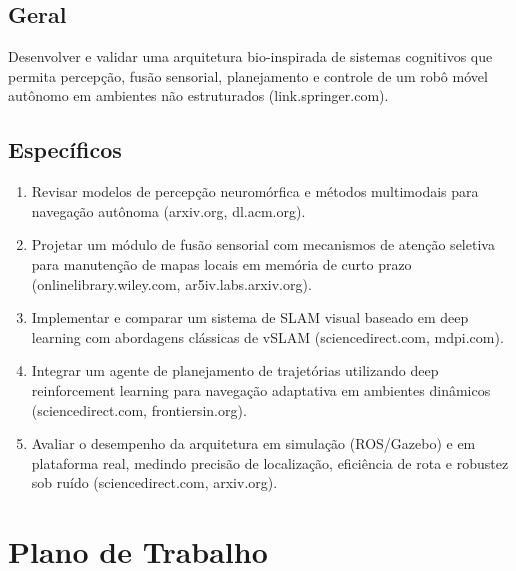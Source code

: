 \documentclass[a4paper,12pt]{article}
\begin{document}
	\subsection{Geral}
	Desenvolver e validar uma arquitetura bio-inspirada de sistemas cognitivos que permita percepção, fusão sensorial, planejamento e controle de um robô móvel autônomo em ambientes não estruturados (link.springer.com).
	
	\subsection{Específicos}
	\begin{enumerate}
		\item Revisar modelos de percepção neuromórfica e métodos multimodais para navegação autônoma (arxiv.org, dl.acm.org).
		\item Projetar um módulo de fusão sensorial com mecanismos de atenção seletiva para manutenção de mapas locais em memória de curto prazo (onlinelibrary.wiley.com, ar5iv.labs.arxiv.org).
		\item Implementar e comparar um sistema de SLAM visual baseado em deep learning com abordagens clássicas de vSLAM (sciencedirect.com, mdpi.com).
		\item Integrar um agente de planejamento de trajetórias utilizando deep reinforcement learning para navegação adaptativa em ambientes dinâmicos (sciencedirect.com, frontiersin.org).
		\item Avaliar o desempenho da arquitetura em simulação (ROS/Gazebo) e em plataforma real, medindo precisão de localização, eficiência de rota e robustez sob ruído (sciencedirect.com, arxiv.org).
	\end{enumerate}
	
	\section{Plano de Trabalho}


	
\end{document}
